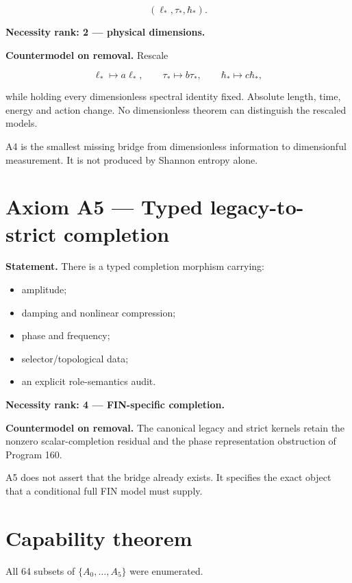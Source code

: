 \documentclass[11pt,a4paper,openany]{report}
\begin{document}
\[
(\ell_*,\tau_*,\hbar_*).
\]

\textbf{Necessity rank: 2 --- physical dimensions.}

\textbf{Countermodel on removal.} Rescale

\[
\ell_*\mapsto a\ell_*,
\qquad
\tau_*\mapsto b\tau_*,
\qquad
\hbar_*\mapsto c\hbar_*,
\]

while holding every dimensionless spectral identity fixed. Absolute length, time, energy and action change. No dimensionless theorem can distinguish the rescaled models.

A4 is the smallest missing bridge from dimensionless information to dimensionful measurement. It is not produced by Shannon entropy alone.

\section{Axiom A5 --- Typed legacy-to-strict completion}

\textbf{Statement.} There is a typed completion morphism carrying:

\begin{itemize}
\item 
amplitude;

\item 
damping and nonlinear compression;

\item 
phase and frequency;

\item 
selector/\allowbreak{}topological data;

\item 
an explicit role-semantics audit.

\end{itemize}

\textbf{Necessity rank: 4 --- FIN-specific completion.}

\textbf{Countermodel on removal.} The canonical legacy and strict kernels retain the nonzero scalar-completion residual and the phase representation obstruction of Program 160.

A5 does not assert that the bridge already exists. It specifies the exact object that a conditional full FIN model must supply.

\section{Capability theorem}

All 64 subsets of \(\{A_0,\ldots,A_5\}\) were enumerated.
\end{document}
